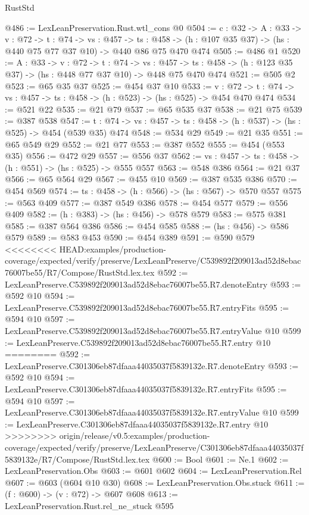 \begin{lexlean}{RustStd}
\begin{coremodule}
{\begin{coremodule}
@486 := LexLeanPreservation.Rust.wtl_cons @0
@504 := {c : @32} ->
  {A : @33} ->
  {v : @72} ->
  {t : @74} ->
  {vs : @457} ->
  {ts : @458} -> (h : @107 @35 @37) -> (hs : @440 @75 @77 @37 @10) -> @440 @86 @75 @470 @474
@505 := @486 @1
@520 := {A : @33} ->
  {v : @72} ->
  {t : @74} ->
  {vs : @457} -> {ts : @458} -> (h : @123 @35 @37) -> (hs : @448 @77 @37 @10) -> @448 @75 @470 @474
@521 := @505 @2
@523 := @65 @35 @37
@525 := @454 @37 @10
@533 := {v : @72} ->
  {t : @74} -> {vs : @457} -> {ts : @458} -> (h : @523) -> (hs : @525) -> @454 @470 @474
@534 := @521 @22
@535 := @21 @79
@537 := @65 @535 @37
@538 := @21 @75
@539 := @387 @538
@547 := {t : @74} -> {vs : @457} -> {ts : @458} -> (h : @537) -> (hs : @525) -> @454 (@539 @35) @474
@548 := @534 @29
@549 := @21 @35
@551 := @65 @549 @29
@552 := @21 @77
@553 := @387 @552
@555 := @454 (@553 @35)
@556 := @472 @29
@557 := @556 @37
@562 := {vs : @457} -> {ts : @458} -> (h : @551) -> (hs : @525) -> @555 @557
@563 := @548 @386
@564 := @21 @37
@566 := @65 @564 @29
@567 := @455 @10
@569 := @387 @535 @386
@570 := @454 @569
@574 := {ts : @458} -> (h : @566) -> (hs : @567) -> @570 @557
@575 := @563 @409
@577 := @387 @549 @386
@578 := @454 @577
@579 := @556 @409
@582 := (h : @383) -> (hs : @456) -> @578 @579
@583 := @575 @381
@585 := @387 @564 @386
@586 := @454 @585
@588 := (hs : @456) -> @586 @579
@589 := @583 @453
@590 := @454 @389
@591 := @590 @579
<<<<<<<< HEAD:examples/production-coverage/expected/verify/preserve/LexLeanPreserve/C539892f209013ad52d8ebac76007be55/R7/Compose/RustStd.lex.tex
@592 := LexLeanPreserve.C539892f209013ad52d8ebac76007be55.R7.denoteEntry
@593 := @592 @10
@594 := LexLeanPreserve.C539892f209013ad52d8ebac76007be55.R7.entryFits
@595 := @594 @10
@597 := LexLeanPreserve.C539892f209013ad52d8ebac76007be55.R7.entryValue @10
@599 := LexLeanPreserve.C539892f209013ad52d8ebac76007be55.R7.entry @10
========
@592 := LexLeanPreserve.C301306eb87dfaaa44035037f5839132e.R7.denoteEntry
@593 := @592 @10
@594 := LexLeanPreserve.C301306eb87dfaaa44035037f5839132e.R7.entryFits
@595 := @594 @10
@597 := LexLeanPreserve.C301306eb87dfaaa44035037f5839132e.R7.entryValue @10
@599 := LexLeanPreserve.C301306eb87dfaaa44035037f5839132e.R7.entry @10
>>>>>>>> origin/release/v0.5:examples/production-coverage/expected/verify/preserve/LexLeanPreserve/C301306eb87dfaaa44035037f5839132e/R7/Compose/RustStd.lex.tex
@600 := Bool
@601 := Ne.{1}
@602 := LexLeanPreservation.Obs
@603 := @601 @602
@604 := LexLeanPreservation.Rel
@607 := @603 (@604 @10 @30)
@608 := LexLeanPreservation.Obs.stuck
@611 := (f : @600) -> (v : @72) -> @607 @608
@613 := LexLeanPreservation.Rust.rel_ne_stuck @595

\end{coremodule}}
\end{coremodule}
\end{lexlean}

